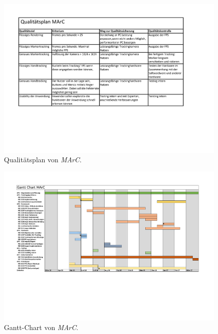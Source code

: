 \begin{figure}[htbp]
	\centering
	\includegraphics[angle=90,scale=.9, trim=1cm 1cm 3.5cm 1 cm]{kapitel/anhang/Qualitaetsplan.pdf}
	 \caption[Qualitätsplan von \textit{MArC}]{Qualitätsplan von \textit{MArC}.}
	\label{fig:qualitaetsplan}
\end{figure}
\newpage

\begin{figure}[htbp]
	\centering
	\includegraphics[angle=90,scale=.8, trim=1cm 1cm 3.5cm 1 cm]{kapitel/anhang/GanttChart.pdf}
	 \caption[Gantt-Chart von \textit{MArC}]{Gantt-Chart von \textit{MArC}.}
	\label{fig:ganttchart}
\end{figure}
\newpage

